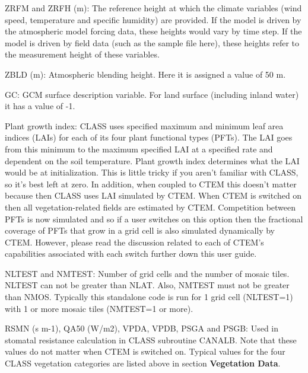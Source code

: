 \begin{DoxyItemize}
\item Z\+R\+F\+M and Z\+R\+F\+H (m)\+: The reference height at which the climate variables (wind speed, temperature and specific humidity) are provided. If the model is driven by the atmospheric model forcing data, these heights would vary by time step. If the model is driven by field data (such as the sample file here), these heights refer to the measurement height of these variables.
\item Z\+B\+L\+D (m)\+: Atmospheric blending height. Here it is assigned a value of 50 m.
\item G\+C\+: G\+C\+M surface description variable. For land surface (including inland water) it has a value of -\/1.
\item Plant growth index\+: C\+L\+A\+S\+S uses specified maximum and minimum leaf area indices (L\+A\+Is) for each of its four plant functional types (P\+F\+Ts). The L\+A\+I goes from this minimum to the maximum specified L\+A\+I at a specified rate and dependent on the soil temperature. Plant growth index determines what the L\+A\+I would be at initialization. This is little tricky if you aren’t familiar with C\+L\+A\+S\+S, so it’s best left at zero. In addition, when coupled to C\+T\+E\+M this doesn’t matter because then C\+L\+A\+S\+S uses L\+A\+I simulated by C\+T\+E\+M. When C\+T\+E\+M is switched on then all vegetation-\/related fields are estimated by C\+T\+E\+M. Competition between P\+F\+Ts is now simulated and so if a user switches on this option then the fractional coverage of P\+F\+Ts that grow in a grid cell is also simulated dynamically by C\+T\+E\+M. However, please read the discussion related to each of C\+T\+E\+M’s capabilities associated with each switch further down this user guide.
\item N\+L\+T\+E\+S\+T and N\+M\+T\+E\+S\+T\+: Number of grid cells and the number of mosaic tiles. N\+L\+T\+E\+S\+T can not be greater than N\+L\+A\+T. Also, N\+M\+T\+E\+S\+T must not be greater than N\+M\+O\+S. Typically this standalone code is run for 1 grid cell (N\+L\+T\+E\+S\+T=1) with 1 or more mosaic tiles (N\+M\+T\+E\+S\+T=1 or more).
\item R\+S\+M\+N (s m-\/1), Q\+A50 (W/m2), V\+P\+D\+A, V\+P\+D\+B, P\+S\+G\+A and P\+S\+G\+B\+: Used in stomatal resistance calculation in C\+L\+A\+S\+S subroutine C\+A\+N\+A\+L\+B. Note that these values do not matter when C\+T\+E\+M is switched on. Typical values for the four C\+L\+A\+S\+S vegetation categories are listed above in section {\bfseries Vegetation Data}.

\end{DoxyItemize}
